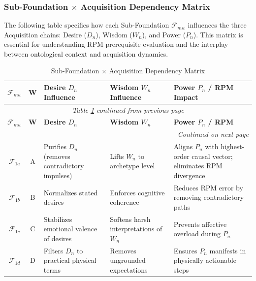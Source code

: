\documentclass[11pt,twoside,openright]{book}
\theoremstyle{definition}
\theoremstyle{plain}
\theoremstyle{remark}
\newcommand{\Foundations}{\mathcal{F}}
\begin{document}
\subsubsection{Sub-Foundation $\times$ Acquisition Dependency Matrix}

The following table specifies how each Sub-Foundation $\Foundations_{mw}$ influences
the three Acquisition chains: Desire ($D_n$), Wisdom ($W_n$), and Power ($P_n$).
This matrix is essential for understanding RPM prerequisite evaluation and
the interplay between ontological context and acquisition dynamics.

\begin{longtable}{c|c|p{3.5cm}|p{3.5cm}|p{4cm}}
\caption{Sub-Foundation $\times$ Acquisition Dependency Matrix}
\label{tab:subfoundation-acquisition-matrix} \\
\toprule
\textbf{$\Foundations_{mw}$}
& \textbf{W}
& \textbf{Desire $D_n$ Influence}
& \textbf{Wisdom $W_n$ Influence}
& \textbf{Power $P_n$ / RPM Impact} \\
\midrule
\endfirsthead
\multicolumn{5}{c}{\textit{Table \ref{tab:subfoundation-acquisition-matrix} continued from previous page}} \\
\toprule
\textbf{$\Foundations_{mw}$} & \textbf{W} & \textbf{Desire $D_n$} & \textbf{Wisdom $W_n$} & \textbf{Power $P_n$ / RPM} \\
\midrule
\endhead
\midrule
\multicolumn{5}{r}{\textit{Continued on next page}} \\
\endfoot
\bottomrule
\endlastfoot

$\Foundations_{1a}$ & A & Purifies $D_n$ (removes contradictory impulses)
& Lifts $W_n$ to archetype level
& Aligns $P_n$ with highest-order causal vector; eliminates RPM divergence \\

$\Foundations_{1b}$ & B & Normalizes stated desires
& Enforces cognitive coherence
& Reduces RPM error by removing contradictory paths \\

$\Foundations_{1c}$ & C & Stabilizes emotional valence of desires
& Softens harsh interpretations of $W_n$
& Prevents affective overload during $P_n$ \\

$\Foundations_{1d}$ & D & Filters $D_n$ to practical physical terms
& Removes ungrounded expectations
& Ensures $P_n$ manifests in physically actionable steps \\


\end{longtable}
\end{document}
